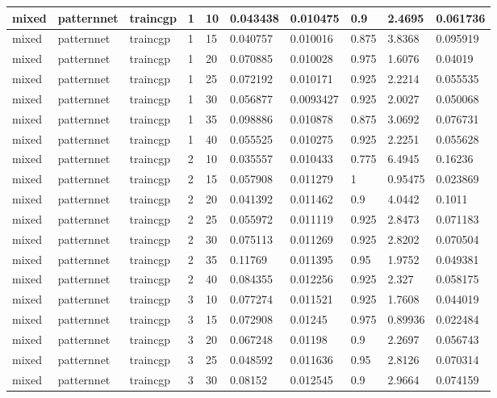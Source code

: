 \begin{longtable}{lllllllll}
mixed & patternnet & traincgp & 1 & 10 & 0.043438 & 0.010475 & 0.9 & 2.4695 & 0.061736 \\ \hline 
mixed & patternnet & traincgp & 1 & 15 & 0.040757 & 0.010016 & 0.875 & 3.8368 & 0.095919 \\ \hline 
mixed & patternnet & traincgp & 1 & 20 & 0.070885 & 0.010028 & 0.975 & 1.6076 & 0.04019 \\ \hline 
mixed & patternnet & traincgp & 1 & 25 & 0.072192 & 0.010171 & 0.925 & 2.2214 & 0.055535 \\ \hline 
mixed & patternnet & traincgp & 1 & 30 & 0.056877 & 0.0093427 & 0.925 & 2.0027 & 0.050068 \\ \hline 
mixed & patternnet & traincgp & 1 & 35 & 0.098886 & 0.010878 & 0.875 & 3.0692 & 0.076731 \\ \hline 
mixed & patternnet & traincgp & 1 & 40 & 0.055525 & 0.010275 & 0.925 & 2.2251 & 0.055628 \\ \hline 
mixed & patternnet & traincgp & 2 & 10 & 0.035557 & 0.010433 & 0.775 & 6.4945 & 0.16236 \\ \hline 
mixed & patternnet & traincgp & 2 & 15 & 0.057908 & 0.011279 & 1 & 0.95475 & 0.023869 \\ \hline 
mixed & patternnet & traincgp & 2 & 20 & 0.041392 & 0.011462 & 0.9 & 4.0442 & 0.1011 \\ \hline 
mixed & patternnet & traincgp & 2 & 25 & 0.055972 & 0.011119 & 0.925 & 2.8473 & 0.071183 \\ \hline 
mixed & patternnet & traincgp & 2 & 30 & 0.075113 & 0.011269 & 0.925 & 2.8202 & 0.070504 \\ \hline 
mixed & patternnet & traincgp & 2 & 35 & 0.11769 & 0.011395 & 0.95 & 1.9752 & 0.049381 \\ \hline 
mixed & patternnet & traincgp & 2 & 40 & 0.084355 & 0.012256 & 0.925 & 2.327 & 0.058175 \\ \hline 
mixed & patternnet & traincgp & 3 & 10 & 0.077274 & 0.011521 & 0.925 & 1.7608 & 0.044019 \\ \hline 
mixed & patternnet & traincgp & 3 & 15 & 0.072908 & 0.01245 & 0.975 & 0.89936 & 0.022484 \\ \hline 
mixed & patternnet & traincgp & 3 & 20 & 0.067248 & 0.01198 & 0.9 & 2.2697 & 0.056743 \\ \hline 
mixed & patternnet & traincgp & 3 & 25 & 0.048592 & 0.011636 & 0.95 & 2.8126 & 0.070314 \\ \hline 
mixed & patternnet & traincgp & 3 & 30 & 0.08152 & 0.012545 & 0.9 & 2.9664 & 0.074159 \\ \hline 

\end{longtable}
